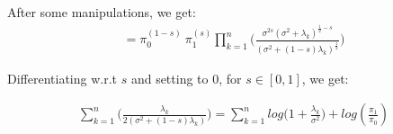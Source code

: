 \documentclass[12pt]{report}
\begin{document}
\begin{exmp}
\noindent After some manipulations, we get:
                    \begin{align}
                                 = \pi_0^{(1-s)} \: \pi_1^{(s)} \prod_{k=1}^{n} \Bigg(  \frac{\sigma^{2s} (\sigma^{2} + \lambda_k)^{\frac{1}{2} - s}}{(\sigma^{2} + (1-s)\lambda_k)^{\frac{1}{2}}}    \Bigg)
                     \end{align}

\noindent Differentiating w.r.t $s$ and setting to 0, for $ s \in [0,1] $, we get:

                     \begin{align}
                          \sum_{k=1}^{n} \Big( \frac{\lambda_k}{2(\sigma^{2} + (1-s)\lambda_k)}   \Big) =   \sum_{k=1}^{n} log\big( 1 + \frac{\lambda_k}{\sigma^{2}} \big) + log(\frac{\pi_1}{\pi_0})
                     \end{align}

\end{exmp}





	
\end{document}
